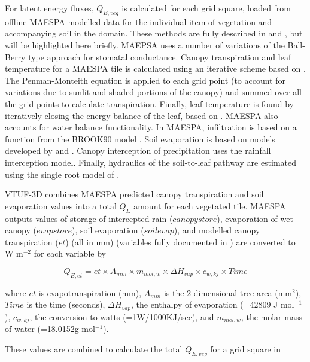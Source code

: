 \documentclass[final,3p,times,authoryear]{elsarticle}
\begin{document}
For latent energy fluxes, $Q_{E,veg}$ is calculated for each grid square, loaded from offline MAESPA modelled data for the individual item of vegetation and accompanying soil in the domain.
These methods are fully described in \cite{Duursma2012} and \cite{Medlyn2007}, but will be highlighted here briefly. MAEPSA uses a number of variations of the Ball-Berry type approach \citep{Ball1987,Duursma2012} for stomatal conductance. Canopy transpiration and leaf temperature for a MAESPA tile is calculated using an iterative scheme based on \cite{Wang1998}. The Penman-Monteith equation \citep{Penman1948,Monteith1965} is applied to each grid point (to account for variations due to sunlit and shaded portions of the canopy) and summed over all the grid points to calculate transpiration. Finally, leaf temperature is found by iteratively closing the energy balance of the leaf, based on \cite{Wang1998}. MAESPA also accounts for water balance functionality. In MAESPA, infiltration is based on a function from the BROOK90 model \citep{Federer2003}. Soil evaporation is based on models developed by \cite{Choudhury1988} and \cite{Williams2001}. Canopy interception of precipitation uses the \cite{Rutter1975} rainfall interception model. Finally, hydraulics of the soil-to-leaf pathway are estimated using the single root model of \cite{Gardner1960}.

VTUF-3D combines MAESPA predicted canopy transpiration and soil evaporation values into a total $Q_{E}$ amount for each vegetated tile. MAESPA outputs values of storage of intercepted rain ($canopystore$), evaporation of wet canopy ($evapstore$), soil evaporation ($soilevap$), and modelled canopy transpiration ($et$) (all in mm) (variables fully documented in \cite{Duursma2016}) are converted to W m$^{-2}$ for each variable by 

\begin{equation}\label{eq:mmtowm2} 
  Q_{E,et} = et \times A _{mm} \times m_{mol,w} \times \Delta H_{vap} \times c_{w,kj} \times Time  
\end{equation} 
 
where $et$ is evapotranspiration (mm), $A _{mm}$ is the 2-dimensional tree area (mm$^{2}$), $Time$ is the time (seconds), $\Delta H_{vap}$, the enthalpy of evaporation (=42809 J mol$^{-1}$), $c_{w,kj}$, the conversion to watts (=1W/1000KJ/sec), and $m_{mol,w}$, the molar mass of water (=18.0152g mol$^{-1}$).

These values are combined to calculate the total $Q_{E,veg}$ for a grid square in 
\end{document}
